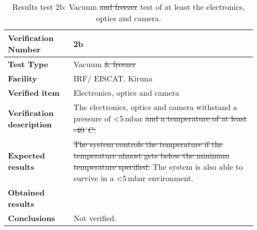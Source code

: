 \begin{table}[H]
\centering

\begin{tabular}{|m{}| m{} |}
\hline
\textbf{Verification Number} 		& 2b 							 \\ \hline
\textbf{Test Type} 					& Vacuum \st{\& freezer}				 \\ \hline
\textbf{Facility} 					& IRF/ EISCAT, Kiruna 			 \\ \hline
\textbf{Verified item} 				& Electronics, optics and camera \\ \hline

\textbf{Verification description} 	& The electronics, optics and camera withstand a pressure of <5\,mbar \st{and a temperature of at least -40\,$^\circ$C.} \\ \hline

\textbf{Expected results} 			& \st{The system controls the temperature if the temperature almost gets below the minimum temperature specified.} The system is also able to survive in a <5\,mbar environment.\\ \hline

\textbf{Obtained results} 			& \\ \hline

\textbf{Conclusions} 				& Not verified.		\\ \hline
\end{tabular}
\caption{Results test 2b: Vacuum \st{and freezer} test of at least the electronics, optics and camera.}
\label{tab:testresult2:vacuum}
\end{table}


\raggedbottom